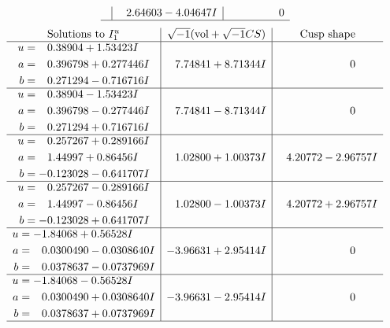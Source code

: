 \documentclass[1p]{elsarticle_modified}
\theoremstyle{definition}
\newcommand{\I}{\sqrt{-1}}
\begin{document}
$$\begin{array}{c|c|c}
 & \phantom{-}2.64603 - 4.04647 I & \phantom{-0.000000 } 0\\
 \hline 
 \end{array}$$\newpage$$\begin{array}{c|c|c}  
\text{Solutions to }I^u_{1}& \I (\text{vol} + \sqrt{-1}CS) & \text{Cusp shape}\\
 \hline 
\begin{aligned}
u &= \phantom{-}0.38904 + 1.53423 I \\
a &= \phantom{-}0.396798 + 0.277446 I \\
b &= \phantom{-}0.271294 - 0.716716 I\end{aligned}
 & \phantom{-}7.74841 + 8.71344 I & \phantom{-0.000000 } 0 \\ \hline\begin{aligned}
u &= \phantom{-}0.38904 - 1.53423 I \\
a &= \phantom{-}0.396798 - 0.277446 I \\
b &= \phantom{-}0.271294 + 0.716716 I\end{aligned}
 & \phantom{-}7.74841 - 8.71344 I & \phantom{-0.000000 } 0 \\ \hline\begin{aligned}
u &= \phantom{-}0.257267 + 0.289166 I \\
a &= \phantom{-}1.44997 + 0.86456 I \\
b &= -0.123028 - 0.641707 I\end{aligned}
 & \phantom{-}1.02800 + 1.00373 I & \phantom{-}4.20772 - 2.96757 I \\ \hline\begin{aligned}
u &= \phantom{-}0.257267 - 0.289166 I \\
a &= \phantom{-}1.44997 - 0.86456 I \\
b &= -0.123028 + 0.641707 I\end{aligned}
 & \phantom{-}1.02800 - 1.00373 I & \phantom{-}4.20772 + 2.96757 I \\ \hline\begin{aligned}
u &= -1.84068 + 0.56528 I \\
a &= \phantom{-}0.0300490 - 0.0308640 I \\
b &= \phantom{-}0.0378637 - 0.0737969 I\end{aligned}
 & -3.96631 + 2.95414 I & \phantom{-0.000000 } 0 \\ \hline\begin{aligned}
u &= -1.84068 - 0.56528 I \\
a &= \phantom{-}0.0300490 + 0.0308640 I \\
b &= \phantom{-}0.0378637 + 0.0737969 I\end{aligned}
 & -3.96631 - 2.95414 I & \phantom{-0.000000 } 0\\
 \hline 
 \end{array}$$\newpage\newpage\renewcommand{\arraystretch}{1}
\end{document}
